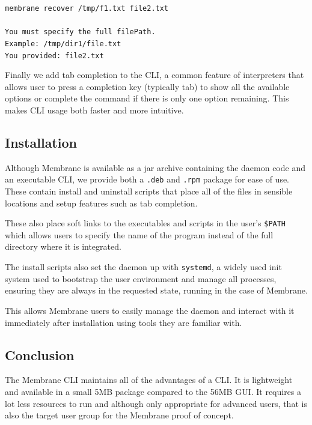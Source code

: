 \documentclass[11pt, a4paper, twocolumn, twoside]{report}
\def\code#1{\texttt{#1}}
\begin{document}
\begin{displayquote}
 \scriptsize
 \code{membrane recover /tmp/f1.txt file2.txt} \\ \\
 \code{You must specify the full filePath.} \\
 \code{Example: /tmp/dir1/file.txt} \\
 \code{You provided: file2.txt}
\end{displayquote}

Finally we add tab completion to the CLI, a common feature of interpreters that allows user to press a completion key (typically tab) to show all the available options or complete the command if there is only one option remaining. This makes CLI usage both faster and more intuitive.

\subsection{Installation}

Although Membrane is available as a jar archive containing the daemon code and an executable CLI, we provide both a \code{.deb} and \code{.rpm} package for ease of use. These contain install and uninstall scripts that place all of the files in sensible locations and setup features such as tab completion.

These also place soft links to the executables and scripts in the user's \code{\$PATH} which allows users to specify the name of the program instead of the full directory where it is integrated.

The install scripts also set the daemon up with \code{systemd}, a widely used init system \citep{saunders2015systemd} used to bootstrap the user environment and manage all processes, ensuring they are always in the requested state, running in the case of Membrane.

This allows Membrane users to easily manage the daemon and interact with it immediately after installation using tools they are familiar with.

\subsection{Conclusion}

The Membrane CLI maintains all of the advantages of a CLI. It is lightweight and available in a small 5MB package compared to the 56MB GUI. It requires a lot less resources to run and although only appropriate for advanced users, that is also the target user group for the Membrane proof of concept.
\end{document}
